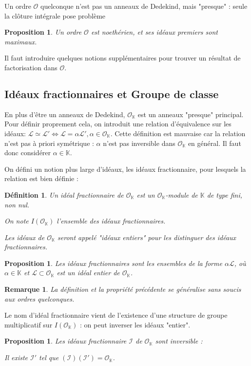 \documentclass{article}
\newcommand{\K}[0]{\mathbb{K}}
\newcommand{\OR}[0]{\mathcal{O}}
\newcommand{\LR}[0]{\mathcal{L}}
\newcommand{\IR}[0]{\mathcal{I}}
\newtheorem{Prop}[The]{Proposition}
\newtheorem{Def}[The]{Définition}
\newtheorem{Rem}[The]{Remarque}
\begin{document}
Un ordre $\OR$ quelconque n'est pas un anneaux de Dedekind, mais "presque" : seule la clôture intégrale pose problème

\begin{Prop}
	Un ordre $\OR$ est noethérien, et ses idéaux premiers sont maximaux.
\end{Prop}

Il faut introduire quelques notions supplémentaires pour trouver un résultat de factorisation dans $\OR$.

\subsection{Idéaux fractionnaires et Groupe de classe}

En plus d'être un anneaux de Dedekind, $\OR_{\K}$ est un anneaux "presque" principal. Pour définir proprement cela, on introduit une relation d'équivalence sur les idéaux: $\LR\simeq\LR'\iff\LR = \alpha\LR',\alpha\in\OR_{\K}$. Cette définition est mauvaise car la relation n'est pas à priori symétrique : $\alpha$ n'est pas inversible dans $\OR_{\K}$ en général. Il faut donc considérer $\alpha\in\K$.

On défini un notion plus large d'idéaux, les idéaux fractionnaire, pour lesquels la relation est bien définie :

\begin{Def}
	Un idéal fractionnaire de $\OR_{\K}$ est un $\OR_{\K}$-module de $\K$ de type fini, non nul. 
	
	On note $I(\OR_{\K})$ l'ensemble des idéaux fractionnaires. 
	
	Les idéaux de $\OR_{\K}$ seront appelé "idéaux entiers" pour les distinguer des idéaux fractionnaires. 
\end{Def}

\begin{Prop}
	Les idéaux fractionnaires sont les ensembles de la forme $\alpha\LR$, où $\alpha\in\K$ et $\LR\subset\OR_{\K}$ est un idéal entier de $\OR_{\K}$.
\end{Prop}

\begin{Rem}
	La définition et la propriété précédente se généralise sans soucis aux ordres quelconques. 
\end{Rem}


Le nom d'idéal fractionnaire vient de l'existence d'une structure de groupe multiplicatif sur $I(\OR_{\K})$ : on peut inverser les idéaux "entier". 

\begin{Prop}
	Les idéaux fractionnaire $\IR$ de $\OR_{\K}$ sont inversible :
	
	Il existe $\IR'$ tel que $(\IR)(\IR') = \OR_{\K}$.
\end{Prop}
\end{document}
